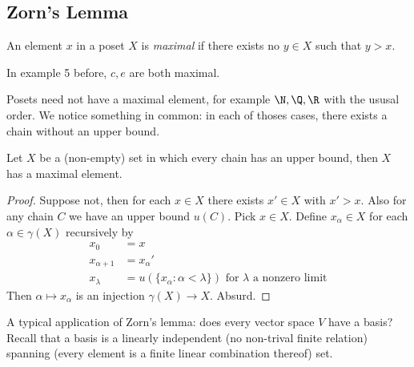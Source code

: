 \documentclass[a4paper]{article}
\begin{document}
\subsection{Zorn's Lemma}

\begin{definition}
  An element \(x\) in a poset \(X\) is \emph{maximal} if there exists no \(y \in X\) such that \(y > x\).
\end{definition}

\begin{eg}
  In example 5 before, \(c, e\) are both maximal.
\end{eg}

Posets need not have a maximal element, for example \(\N, \Q, \R\) with the ususal order. We notice something in common: in each of thoses cases, there exists a chain without an upper bound.

\begin{theorem}
  Let \(X\) be a (non-empty) set in which every chain has an upper bound, then \(X\) has a maximal element.
\end{theorem}

\begin{proof}
  Suppose not, then for each \(x \in X\) there exists \(x' \in X\) with \(x' > x\). Also for any chain \(C\) we have an upper bound \(u(C)\). Pick \(x \in X\). Define \(x_\alpha \in X\) for each \(\alpha \in \gamma(X)\) recursively by
  \begin{align*}
    x_0 &= x \\
    x_{\alpha + 1} &= x_\alpha' \\
    x_{\lambda} &= u(\{x_\alpha: \alpha < \lambda\}) \text{ for \(\lambda\) a nonzero limit}
  \end{align*}
  Then \(\alpha \mapsto x_\alpha\) is an injection \(\gamma(X) \to X\). Absurd.
\end{proof}

A typical application of Zorn's lemma: does every vector space \(V\) have a basis? Recall that a basis is a linearly independent (no non-trival finite relation) spanning (every element is a finite linear combination thereof) set.
\end{document}
